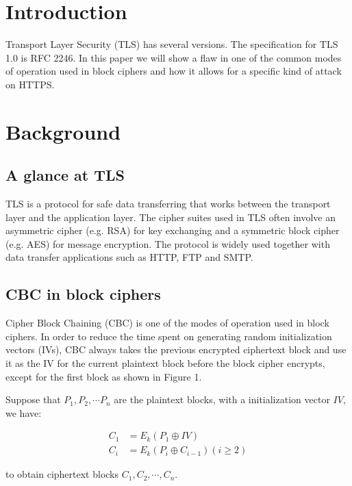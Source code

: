 \documentclass{acm_proc_article-sp}
\begin{document}

\section{Introduction}
Transport Layer Security (TLS) has several versions. The specification for TLS
1.0 is RFC 2246\cite{rfc2246}.
In this paper we will show a flaw in one of the common modes of operation used in block ciphers
and how it allows for a specific kind of attack\cite{beast} on HTTPS.

\section{Background}
\subsection{A glance at TLS}

TLS is a protocol for safe data transferring that works between the transport layer
and the application layer. The cipher suites used in TLS often involve an asymmetric cipher
(e.g. RSA) for key exchanging and a symmetric block cipher (e.g. AES) for message encryption.
The protocol is widely used together with data transfer applications such as HTTP, FTP and SMTP.

\subsection{CBC in block ciphers}
Cipher Block Chaining (CBC) is one of the modes of operation used in block ciphers.
In order to reduce the time spent on generating random initialization vectors (IVs), CBC always takes
the previous encrypted ciphertext block and use it as the IV for the current plaintext block before the
block cipher encrypts, except for the first block as shown in Figure 1.

Suppose that $P_1,P_2,\cdots P_n$ are the plaintext blocks, with a initialization vector $IV$, we have:

$$
\begin{aligned}
C_1&=E_k(P_1\oplus IV)\\
C_i&=E_k(P_{i}\oplus C_{i-1}) (i\geq 2)
\end{aligned}
$$

to obtain ciphertext blocks $C_1,C_2,\cdots,C_n$.
\end{document}
